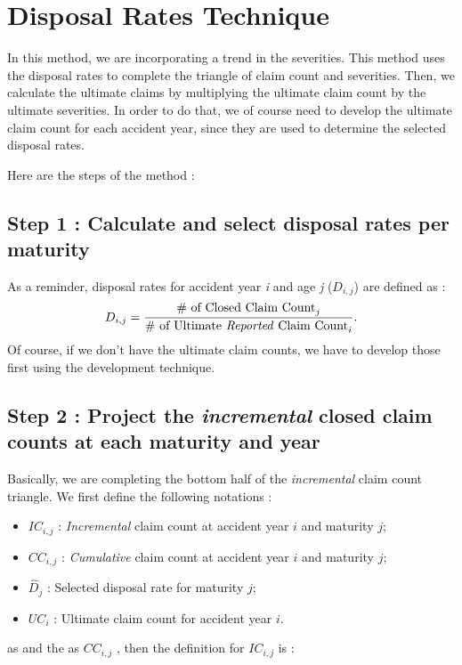 \documentclass[11pt, english]{memoir}
\numberwithin{definition}{section}
\begin{document}
\section{Disposal Rates Technique}
In this method, we are incorporating a trend in the severities. This method uses the disposal rates to complete the triangle of claim count and severities. Then, we calculate the ultimate claims by multiplying the ultimate claim count by the ultimate severities. In order to do that, we of course need to develop the ultimate claim count for each accident year, since they are used to determine the selected disposal rates. 

Here are the steps of the method : 

\subsection*{Step 1 : Calculate and select disposal rates per maturity}
As a reminder, disposal rates for accident year \emph{i} and age \emph{j} ($ D_{i,j} $) are defined as : 
\begin{align*}
D_{i,j} = \frac{\text{\# of Closed Claim Count}_{j}}{\text{\# of Ultimate \emph{Reported} Claim Count}_{i}}.
\end{align*}
\footnotesize*Of course, if we don't have the ultimate claim counts, we have to develop those first using the development technique. \normalsize



\subsection*{Step 2 : Project the \emph{incremental} closed claim counts at each maturity and year}
Basically, we are completing the bottom half of the \emph{incremental} claim count triangle. We  first define the following notations : 
\begin{itemize}
	\item $ IC_{i,j} $ : \emph{Incremental} claim count at accident year $ i $ and maturity $j $;
	\item $ CC_{i,j} $ : \emph{Cumulative} claim count at accident year $ i $ and maturity $j $;
	\item $ \hat{D}_{j} $ : Selected disposal rate for maturity $ j $;
	\item $ UC_{i} $ : Ultimate claim count for accident year $ i $.
\end{itemize}  as  and the  as $ CC_{i,j} $ , then the definition for $ IC_{i,j} $ is :
\end{document}
